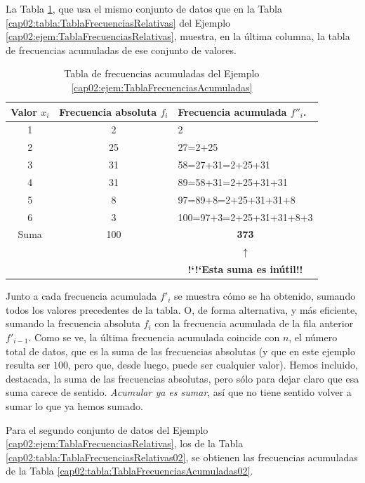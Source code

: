 \begin{ejemplo}
\label{cap02:ejem:TablaFrecuenciasAcumuladas}
La Tabla \ref{cap02:tabla:TablaFrecuenciasAcumuladas}, que usa el mismo conjunto de datos que en la Tabla \ref{cap02:tabla:TablaFrecuenciasRelativas} del Ejemplo \ref{cap02:ejem:TablaFrecuenciasRelativas}, muestra, en la última columna, la tabla de frecuencias acumuladas de ese conjunto de valores.

\begin{table}[ht]
\centering
\begin{tabular}{|c|c|l|}
  \hline
 Valor $x_i$& Frecuencia absoluta $f_i$ & Frecuencia acumulada $f''_i$.\\
  \hline
  1 & 2 & 2 \\
  2 & 25 & 27=2+25 \\
  3 & 31 & 58=27+31=2+25+31 \\
  4 & 31 & 89=58+31=2+25+31+31 \\
  5 & 8 & 97=89+8=2+25+31+31+8 \\
  6 & 3 & 100=97+3=2+25+31+31+8+3 \\
  \hline
  Suma & 100 & \multicolumn{1}{c|}{\bf 373}\\
  \hline
  \multicolumn{2}{c}{}&\multicolumn{1}{c}{$\uparrow$}\\
  \multicolumn{2}{c}{}&\multicolumn{1}{c}{\bf {!`}{!`}Esta suma es inútil!!}\\
\end{tabular}
\caption{Tabla de frecuencias acumuladas del Ejemplo \ref{cap02:ejem:TablaFrecuenciasAcumuladas}}
\label{cap02:tabla:TablaFrecuenciasAcumuladas}
\end{table}

Junto a cada frecuencia acumulada $f'_i$ se muestra cómo se ha obtenido, sumando todos los valores precedentes de la tabla. O, de forma alternativa, y más eficiente, sumando la frecuencia absoluta $f_i$ con la frecuencia acumulada de la fila anterior $f'_{i-1}.$ Como se ve, la última frecuencia acumulada coincide con $n$, el número total de datos, que es la suma de las frecuencias absolutas (y que en este ejemplo resulta ser $100$, pero que, desde luego, puede ser cualquier valor). Hemos incluido, destacada, la suma de las frecuencias absolutas, pero sólo para dejar claro que esa suma carece de sentido. {\em Acumular ya es  sumar}, así que no tiene sentido volver a sumar lo que ya hemos sumado.

Para el segundo conjunto de datos del Ejemplo \ref{cap02:ejem:TablaFrecuenciasRelativas}, los de la Tabla \ref{cap02:tabla:TablaFrecuenciasRelativas02}, se obtienen las frecuencias acumuladas de la Tabla \ref{cap02:tabla:TablaFrecuenciasAcumuladas02}.


\end{ejemplo}
